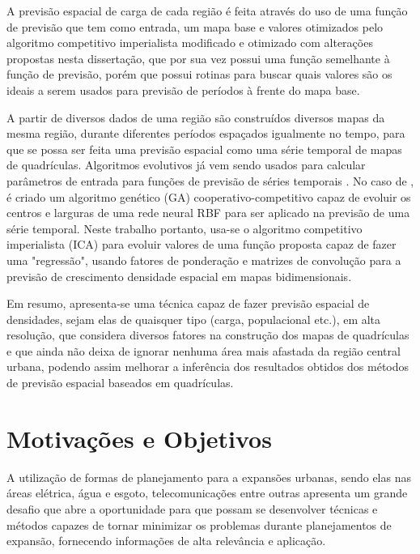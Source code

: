 A previsão espacial de carga de cada região é feita através do uso de uma função de previsão que tem como entrada, um mapa base \cite{willis2002spatial} e valores otimizados pelo algoritmo competitivo imperialista \cite{atashpaz2007imperialist} modificado \cite{roche2011imperialist} e otimizado com alterações propostas nesta dissertação, que por sua vez possui uma função semelhante à função de previsão, porém que possui rotinas para buscar quais valores são os ideais a serem usados para previsão de períodos à frente do mapa base.

A partir de diversos dados de uma região são construídos diversos mapas da mesma região, durante diferentes períodos espaçados igualmente no tempo, para que se possa ser feita uma previsão espacial como uma série temporal de mapas de quadrículas. Algoritmos evolutivos já vem sendo usados para calcular parâmetros de entrada para funções de previsão de séries temporais \cite{whitehead1996cooperative}. No caso de \citeauthor{whitehead1996cooperative}, é criado um algoritmo genético (GA) \cite{mitchell1998introduction} cooperativo-competitivo capaz de evoluir os centros e larguras de uma rede neural RBF \cite{ren2006rbfnn} para ser aplicado na previsão de uma série temporal. Neste trabalho portanto, usa-se o algoritmo competitivo imperialista (ICA) para evoluir valores de uma função proposta capaz de fazer uma "regressão", usando fatores de ponderação e matrizes de convolução para a previsão de crescimento densidade espacial em mapas bidimensionais.

Em resumo, apresenta-se uma técnica capaz de fazer previsão espacial de densidades, sejam elas de quaisquer tipo (carga, populacional etc.), em alta resolução, que considera diversos fatores na construção dos mapas de quadrículas e que ainda não deixa de ignorar nenhuma área mais afastada da região central urbana, podendo assim melhorar a inferência dos resultados obtidos dos métodos de previsão espacial baseados em quadrículas. 


\section{Motivações e Objetivos}

A utilização de formas de planejamento para a expansões urbanas, sendo elas nas áreas elétrica, água e esgoto, telecomunicações entre outras apresenta um grande desafio que abre a oportunidade para que possam se desenvolver técnicas e métodos capazes de tornar minimizar os problemas durante planejamentos de expansão, fornecendo informações de alta relevância e aplicação.


